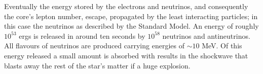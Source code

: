 Eventually the energy stored by the electrons and neutrinos, and consequently the core's lepton number, escape, propagated by the least interacting particles; in this case the neutrinos as described by the Standard Model.
An energy of roughly $10^{53}$ ergs is released in around ten seconds by $10^{58}$ neutrinos and antineutrinos.
All flavours of neutrinos are produced carrying energies of $\sim 10$ MeV.
Of this energy released a small amount is absorbed with results in the shockwave that blasts away the rest of the star's matter if a huge explosion. 






















































